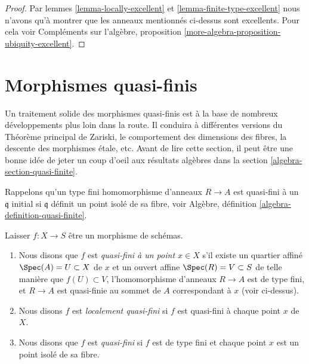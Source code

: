 \begin{proof}
Par lemmes \ref{lemma-locally-excellent} et \ref{lemma-finite-type-excellent} nous n'avons qu'à montrer que les anneaux mentionnés ci-dessus sont excellents. Pour cela voir Compléments sur l'algèbre, proposition \ref{more-algebra-proposition-ubiquity-excellent}.
\end{proof}






\section{Morphismes quasi-finis}
\label{section-quasi-finite}

\noindent
Un traitement solide des morphismes quasi-finis est à la base de nombreux développements plus loin dans la route. Il conduira à différentes versions du Théorème principal de Zariski, le comportement des dimensions des fibres, la descente des morphismes \'etale, etc. Avant de lire cette section, il peut être une bonne idée de jeter un coup d'oeil aux résultats algèbres dans la section \ref{algebra-section-quasi-finite}.

\medskip\noindent
Rappelons qu'un type fini homomorphisme d'anneaux $R \to A$ est quasi-fini à un $\mathfrak q$ initial si $\mathfrak q$ définit un point isolé de sa fibre, voir Algèbre, définition \ref{algebra-definition-quasi-finite}.

\begin{definition}

\label{definition-quasi-finite}

\begin{reference}

\cite[II définition 6.2.3]{EGA}

\end{reference}

Laisser $f : X \to S$ être un morphisme de schémas.

\begin{enumerate}

\item Nous disons que $f$ est {\it quasi-fini à un point $x \in X$} s'il existe un quartier affiné $\Spec(A) = U \subset X$
de $x$ et un ouvert affine $\Spec(R) = V \subset S$ de telle manière que
$f(U) \subset V$, l'homomorphisme d'anneaux $R \to A$ est de type fini, et $R \to A$ est quasi-finie au sommet de $A$ correspondant à $x$
(voir ci-dessus).
\item Nous disons $f$ est {\it localement quasi-fini} si $f$ est quasi-fini à chaque point $x$ de $X$.
\item Nous disons que $f$ est {\it quasi-fini} si $f$ est de type fini et chaque point $x$ est un point isolé de sa fibre.

\end{enumerate}

\end{definition}

